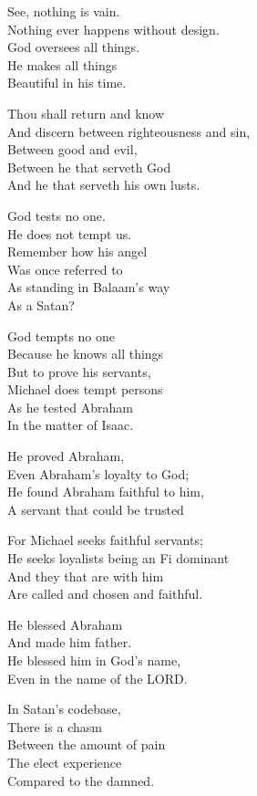\documentclass[
]{book}
\begin{document}
See, nothing is vain.\\
Nothing ever happens without design.\\
God oversees all things.\\
He makes all things\\
Beautiful in his time.

Thou shall return and know\\
And discern between righteousness and sin,\\
Between good and evil,\\
Between he that serveth God\\
And he that serveth his own lusts.

God tests no one.\\
He does not tempt us.\\
Remember how his angel\\
Was once referred to\\
As standing in Balaam's way\\
As a Satan?

God tempts no one\\
Because he knows all things\\
But to prove his servants,\\
Michael does tempt persons\\
As he tested Abraham\\
In the matter of Isaac.

He proved Abraham,\\
Even Abraham's loyalty to God;\\
He found Abraham faithful to him,\\
A servant that could be trusted

For Michael seeks faithful servants;\\
He seeks loyalists being an Fi dominant\\
And they that are with him\\
Are called and chosen and faithful.

He blessed Abraham\\
And made him father.\\
He blessed him in God's name,\\
Even in the name of the LORD.

In Satan's codebase,\\
There is a chasm\\
Between the amount of pain\\
The elect experience\\
Compared to the damned.
\end{document}
